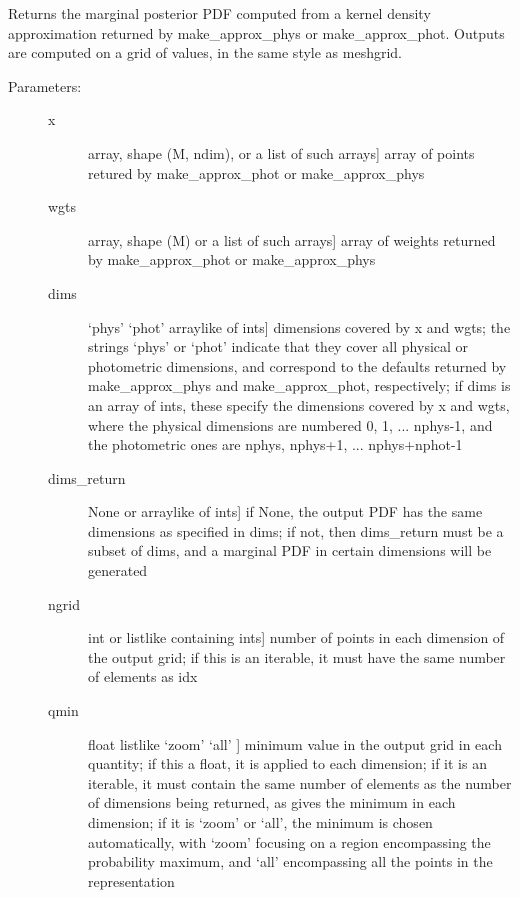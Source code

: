 \documentclass[letterpaper,10pt,english]{sphinxmanual}
\begin{document}
\begin{fulllineitems}
\begin{fulllineitems}
\label{cluster_slug:slugpy.cluster_slug.cluster_slug.mpdf_approx}
Returns the marginal posterior PDF computed from a kernel
density approximation returned by make\_approx\_phys or
make\_approx\_phot. Outputs are computed on a grid of values, in
the same style as meshgrid.
\begin{description}
\item[{Parameters:}] \leavevmode\begin{description}
\item[{x}] \leavevmode{[}array, shape (M, ndim), or a list of such arrays{]}
array of points retured by make\_approx\_phot or
make\_approx\_phys

\item[{wgts}] \leavevmode{[}array, shape (M) or a list of such arrays{]}
array of weights returned by make\_approx\_phot or
make\_approx\_phys

\item[{dims}] \leavevmode{[}`phys' \textbar{} `phot' \textbar{} arraylike of ints{]}
dimensions covered by x and wgts; the strings `phys' or
`phot' indicate that they cover all physical or
photometric dimensions, and correspond to the defaults
returned by make\_approx\_phys and make\_approx\_phot,
respectively; if dims is an array of ints, these specify
the dimensions covered by x and wgts, where the
physical dimensions are numbered 0, 1, ... nphys-1, and
the photometric ones are nphys, nphys+1,
... nphys+nphot-1

\item[{dims\_return}] \leavevmode{[}None or arraylike of ints{]}
if None, the output PDF has the same dimensions as
specified in dims; if not, then dims\_return must be a
subset of dims, and a marginal PDF in certain dimensions
will be generated

\item[{ngrid}] \leavevmode{[}int or listlike containing ints{]}
number of points in each dimension of the output grid;
if this is an iterable, it must have the same number of
elements as idx

\item[{qmin}] \leavevmode{[}float \textbar{} listlike \textbar{} `zoom' \textbar{} `all' {]}
minimum value in the output grid in each quantity; if
this a float, it is applied to each dimension; if it is
an iterable, it must contain the same number of elements
as the number of dimensions being returned, as gives the
minimum in each dimension; if it is `zoom' or `all', the
minimum is chosen automatically, with `zoom' focusing on
a region encompassing the probability maximum, and `all'
encompassing all the points in the representation


\end{description}
\end{description}
\end{fulllineitems}
\end{fulllineitems}
\end{document}
